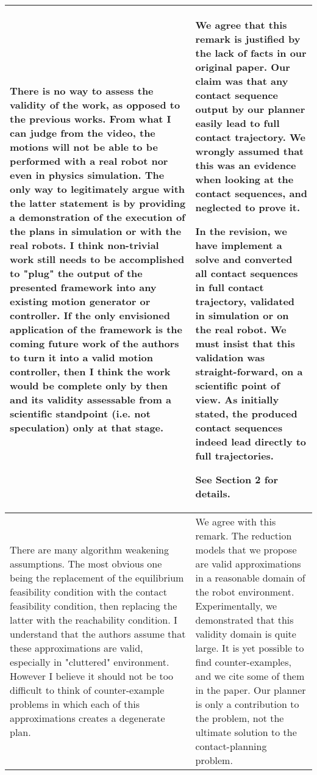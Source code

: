\documentclass[a4paper]{article}
\begin{document}
\begin{longtable}{|p{21em}|p{21em}|}
\\ \hline %
There is no way to assess the validity of the work, as opposed to the previous works. From what I can judge from the video, the motions will not be able to be performed with a real robot nor even in physics simulation. The only way to legitimately argue with the latter statement is by providing a demonstration of the execution of the plans in simulation or with the real robots. I think non-trivial work still needs to be accomplished to "plug" the output of the presented framework into any existing motion generator or controller. If the only envisioned application of the framework is the coming future work of the authors to turn it into a valid motion controller, then I think the work would be complete only by then and its validity assessable from a scientific standpoint (i.e. not speculation) only at that stage.
&
We agree that this remark is justified by the lack of facts in our original paper.
Our claim was that any contact sequence output by our planner easily lead to full contact trajectory.
We wrongly assumed that this was an evidence when looking at the contact sequences, and neglected to prove it.

In the revision, we have implement a solve \mP3 and converted all contact sequences in full contact trajectory, validated in simulation or on the real robot.
We must insist that this validation was straight-forward, on a scientific point of view. 
As initially stated, the produced contact sequences indeed lead directly to full trajectories.

See Section 2 for details.

\\ \hline %
There are many algorithm weakening assumptions. The most obvious one being the replacement of the equilibrium feasibility condition with the contact feasibility condition, then replacing the latter with the reachability condition. I understand that the authors assume that these approximations are valid, especially in "cluttered" environment. However I believe it should not be too difficult to think of counter-example problems in which each of this approximations creates a degenerate plan.
&
We agree with this remark. 
The reduction models that we propose are valid approximations in a reasonable domain of the robot environment.
Experimentally, we demonstrated that this validity domain is quite large.
It is yet possible to find counter-examples, and we cite some of them in the paper.
Our planner is only a contribution to the problem, not the ultimate solution to the contact-planning problem.


\end{longtable}
\end{document}

